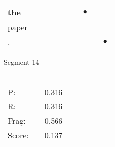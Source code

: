 \documentclass[landscape]{article}
\newcommand{\ssp}{\hspace{2pt}}
\newcommand{\mex}{\cellcolor{g}$\bullet$}
\begin{document}
\begin{tabular}{|l|p{10pt}|p{10pt}|p{10pt}|p{10pt}|p{10pt}|p{10pt}|p{10pt}|p{10pt}|p{10pt}|}
\hline
\ssp \cellcolor{ref6}the \ssp&\hspace{2pt}&\hspace{2pt}&\hspace{2pt}&\hspace{2pt}&\hspace{2pt}&\hspace{2pt}&\hspace{2pt}\mex&\hspace{2pt}&\hspace{2pt}\\
\hline
\ssp paper \ssp&\hspace{2pt}&\hspace{2pt}&\hspace{2pt}&\hspace{2pt}&\hspace{2pt}&\hspace{2pt}&\hspace{2pt}&\hspace{2pt}&\hspace{2pt}\\
\hline
\ssp \cellcolor{ref8}. \ssp&\hspace{2pt}&\hspace{2pt}&\hspace{2pt}&\hspace{2pt}&\hspace{2pt}&\hspace{2pt}&\hspace{2pt}&\hspace{2pt}&\hspace{2pt}\mex\\
\hline
\end{tabular}

\vspace{6pt}
\noindent Segment 14\\\\
\noindent\begin{tabular}{lm{12pt}r}
\hline
P:&&0.316\\
R:&&0.316\\
Frag:&&0.566\\
Score:&&0.137\\
\end{tabular}

\newpage
\end{document}
